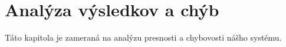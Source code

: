 \chapter{Analýza výsledkov a chýb}

Táto kapitola je zameraná na analýzu presnosti a chybovosti nášho systému.